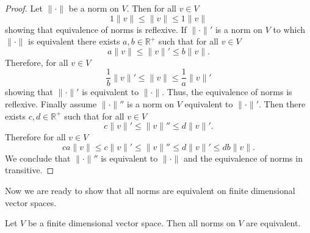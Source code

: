 \begin{proof}
	Let $\|\cdot\|$ be a norm on $V$. Then for all $v\in V$
	\begin{equation}
		1\|v\|\leq\|v\|\leq1\|v\|
	\end{equation}
showing that equivalence of norms is reflexive. If $\|\cdot\|'$ is a norm on $V$ to which $\|\cdot\|$ is equivalent there exists $a,b\in\mathbb{R}^+$ such that for all $v\in V$
	\begin{equation}
		a\|v\|\leq\|v\|'\leq b\|v\|.
	\end{equation}
Therefore, for all $v\in V$
	\begin{equation}
		\frac{1}{b}\|v\|'\leq\|v\|\leq\frac{1}{a}\|v\|'
	\end{equation}
showing that $\|\cdot\|'$ is equivalent to $\|\cdot\|$. Thus, the equivalence of norms is reflexive. Finally assume $\|\cdot\|''$ is a norm on $V$ equivalent to $\|\cdot\|'$. Then there exists $c,d\in\mathbb{R}^+$ such that for all $v\in V$
	\begin{equation}
		c\|v\|'\leq\|v\|''\leq d\|v\|'.
	\end{equation}
Therefore for all $v\in V$
	\begin{equation}
		ca\|v\|\leq c\|v\|'\leq\|v\|''\leq d\|v\|'\leq db\|v\|.
	\end{equation}
We conclude that $\|\cdot\|''$ is equivalent to $\|\cdot\|$ and the equivalence of norms in transitive.
\end{proof}

Now we are ready to show that all norms are equivalent on finite dimensional vector spaces.

\begin{theorem}
	Let $V$ be a finite dimensional vector space. Then all norms on $V$ are equivalent.
\end{theorem}

